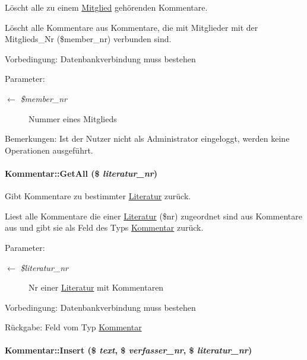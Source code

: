 Löscht alle zu einem \hyperlink{classMitglied}{Mitglied} gehörenden Kommentare. 

Löscht alle Kommentare aus Kommentare, die mit Mitglieder mit der Mitglieds\_\-Nr (\$member\_\-nr) verbunden sind. \begin{Desc}
\item[Vorbedingung:]Datenbankverbindung muss bestehen \end{Desc}
\begin{Desc}
\item[Parameter:]
\begin{description}
\item[\mbox{$\leftarrow$} {\em \$member\_\-nr}]Nummer eines Mitglieds \end{description}
\end{Desc}
\begin{Desc}
\item[Bemerkungen:]Ist der Nutzer nicht als Administrator eingeloggt, werden keine Operationen ausgeführt. \end{Desc}
\hypertarget{classKommentar_33d65db8c526c50017a5fa029bc04416}{
\paragraph[GetAll]{\setlength{\rightskip}{0pt plus 5cm}Kommentar::Get\-All (\$ {\em literatur\_\-nr})}\hfill}
\label{classKommentar_33d65db8c526c50017a5fa029bc04416}


Gibt Kommentare zu bestimmter \hyperlink{classLiteratur}{Literatur} zurück. 

Liest alle Kommentare die einer \hyperlink{classLiteratur}{Literatur} (\$nr) zugeordnet sind aus Kommentare aus und gibt sie als Feld des Typs \hyperlink{classKommentar}{Kommentar} zurück. \begin{Desc}
\item[Parameter:]
\begin{description}
\item[\mbox{$\leftarrow$} {\em \$literatur\_\-nr}]Nr einer \hyperlink{classLiteratur}{Literatur} mit Kommentaren \end{description}
\end{Desc}
\begin{Desc}
\item[Vorbedingung:]Datenbankverbindung muss bestehen \end{Desc}
\begin{Desc}
\item[R\"{u}ckgabe:]Feld vom Typ \hyperlink{classKommentar}{Kommentar} \end{Desc}
\hypertarget{classKommentar_6119b3c12a61d8d5a41cded165517914}{
\paragraph[Insert]{\setlength{\rightskip}{0pt plus 5cm}Kommentar::Insert (\$ {\em text}, \$ {\em verfasser\_\-nr}, \$ {\em literatur\_\-nr})}\hfill}
\label{classKommentar_6119b3c12a61d8d5a41cded165517914}


